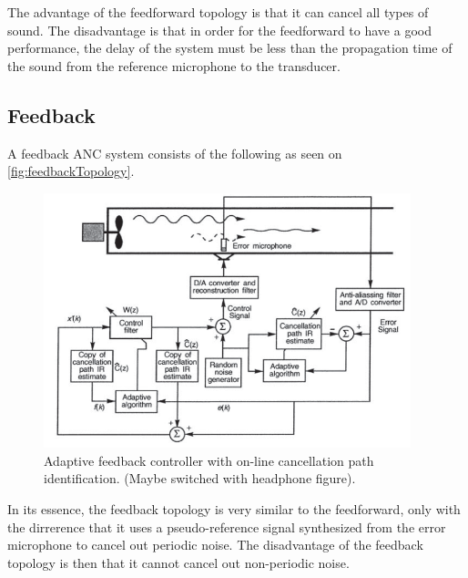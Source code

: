 The advantage of the feedforward topology is that it can cancel all types of sound. The disadvantage is that in order for the feedforward to have a good performance, the delay of the system must be less than the propagation time of the sound from the reference microphone to the transducer.    




\subsection*{Feedback}
A feedback ANC system consists of the following as seen on \autoref{fig:feedbackTopology}.
\begin{figure}[H]
	\centering
	\includegraphics[width=0.95\textwidth]{figures/BasicSystem/feedback}
	\caption{Adaptive feedback controller with on-line cancellation path identification. (Maybe switched with headphone figure).}
	\label{fig:feedbackTopology}
\end{figure}

In its essence, the feedback topology is very similar to the feedforward, only with the dirrerence that it uses a pseudo-reference signal synthesized from the error microphone to cancel out periodic noise. The disadvantage of the feedback topology is then that it cannot cancel out non-periodic noise.    



